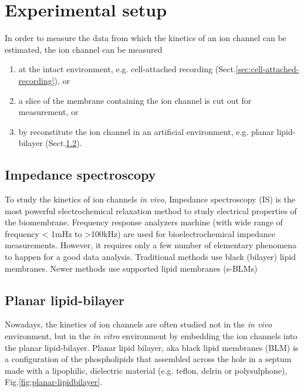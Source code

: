 \section{Experimental setup}
\label{sec:data-recording-setup}

In order to measure the data from which the kinetics of an ion channel can be
estimated, the ion channel can be measured
\begin{enumerate}
  \item  at the intact environment, e.g. cell-attached recording
  (Sect.\ref{sec:cell-attached-recording}), or

  \item a slice of the membrane containing the ion channel is cut out for
  measurement, or

  \item by reconstitute the ion channel in an artificial environment, e.g.
  planar lipid-bilayer (Sect.\ref{sec:planar-lipid-bilayer}).

\end{enumerate}

\subsection{Impedance spectroscopy}
\label{sec:impedance-spectroscopy}

To study the kinetics of ion channels {\it in vivo}, Impedance spectroscopy (IS)
is the most powerful electrochemical relaxation method to study electrical
properties of the biomembrane. Frequency response analyzers machine (with wide
range of frequency < 1mHz to >100kHz) are used for bioelectrochemical impedance
measurements. However, it requires only a few number of elementary phenomena to
happen for a good data analysis. Traditional methods use black (bilayer) lipid
membranes. Newer methods use supported lipid membranes (s-BLMs)

\subsection{Planar lipid-bilayer}
\label{sec:planar-lipid-bilayer}


Nowadays, the kinetics of ion channels are often studied not in the {\it in
vivo} environment, but in the {\it in vitro} environment by embedding the ion
channels into the planar lipid-bilayer. Planar lipid bilayer, aka black lipid
membranes (BLM) is a configuration of the phospholipids that assembled across
the hole in a septum made with a lipophilic, dielectric material (e.g. teflon,
delrin or polysulphone), Fig.\ref{fig:planar-lipidbilayer}.

